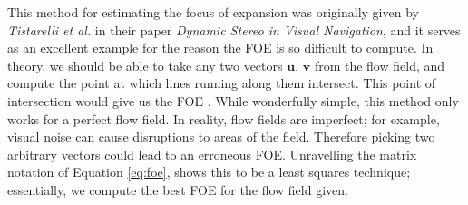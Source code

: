 \documentclass[a4paper,11pt,twoside,openright]{article}
\begin{document}
This method for estimating the focus of expansion was originally given by
\textit{Tistarelli et al.} in their paper
\textit{Dynamic Stereo in Visual Navigation}\cite{Tistarelli1991, ODonovan2005},
and it serves as an excellent example for the reason the FOE is so difficult to
compute. In theory, we should be able to take any two vectors $\mathbf{u}$,
$\mathbf{v}$ from the flow field, and compute the point at which lines
running along them intersect. This point of intersection would give us the
FOE \cite{ODonovan2005}. While wonderfully simple, this method only works for
a perfect flow field. In reality, flow fields are imperfect; for example,
visual noise can cause disruptions to areas of the field. Therefore picking two
arbitrary vectors could lead to an erroneous FOE. Unravelling the matrix notation
of Equation \ref{eq:foe}, shows this to be a least squares technique;
essentially, we compute the best FOE for the flow field given.



\end{document}
